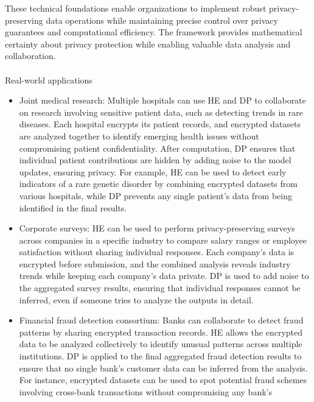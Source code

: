 \documentclass[
  letterpaper,
  DIV=11,
  numbers=noendperiod,
  oneside]{scrartcl}
\makeatletter
\let\oldparagraph\paragraph
\renewcommand{\paragraph}{
    \@ifstar
      \xxxParagraphStar
      \xxxParagraphNoStar
  }
\newcommand{\xxxParagraphStar}[1]{\oldparagraph*{#1}\mbox{}}
\newcommand{\xxxParagraphNoStar}[1]{\oldparagraph{#1}\mbox{}}
\makeatother
\begin{document}
These technical foundations enable organizations to implement robust
privacy-preserving data operations while maintaining precise control
over privacy guarantees and computational efficiency. The framework
provides mathematical certainty about privacy protection while enabling
valuable data analysis and collaboration.

\paragraph{Real-world applications}\label{real-world-applications-1}

\begin{itemize}
\item
  Joint medical research: Multiple hospitals can use HE and DP to
  collaborate on research involving sensitive patient data, such as
  detecting trends in rare diseases. Each hospital encrypts its patient
  records, and encrypted datasets are analyzed together to identify
  emerging health issues without compromising patient confidentiality.
  After computation, DP ensures that individual patient contributions
  are hidden by adding noise to the model updates, ensuring privacy. For
  example, HE can be used to detect early indicators of a rare genetic
  disorder by combining encrypted datasets from various hospitals, while
  DP prevents any single patient's data from being identified in the
  final results.
\item
  Corporate surveys: HE can be used to perform privacy-preserving
  surveys across companies in a specific industry to compare salary
  ranges or employee satisfaction without sharing individual responses.
  Each company's data is encrypted before submission, and the combined
  analysis reveals industry trends while keeping each company's data
  private. DP is used to add noise to the aggregated survey results,
  ensuring that individual responses cannot be inferred, even if someone
  tries to analyze the outputs in detail.
\item
  Financial fraud detection consortium: Banks can collaborate to detect
  fraud patterns by sharing encrypted transaction records. HE allows the
  encrypted data to be analyzed collectively to identify unusual
  patterns across multiple institutions. DP is applied to the final
  aggregated fraud detection results to ensure that no single bank's
  customer data can be inferred from the analysis. For instance,
  encrypted datasets can be used to spot potential fraud schemes
  involving cross-bank transactions without compromising any bank's

\end{itemize}
\end{document}
